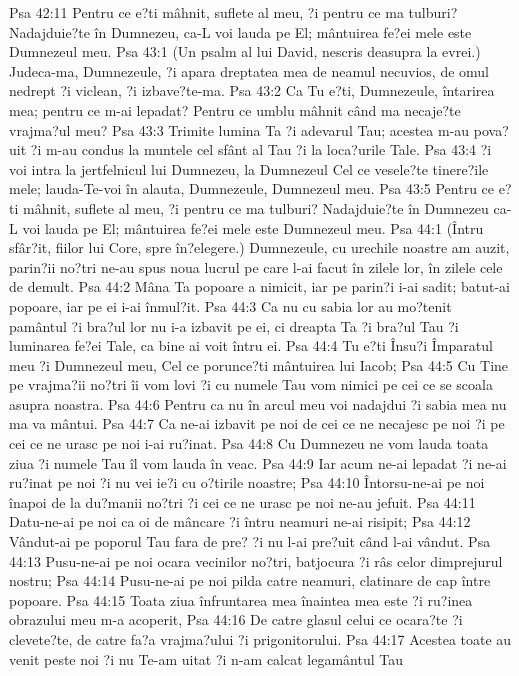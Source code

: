 Psa 42:11  Pentru ce e?ti mâhnit, suflete al meu, ?i pentru ce ma tulburi? Nadajduie?te în Dumnezeu, ca-L voi lauda pe El; mântuirea fe?ei mele este Dumnezeul meu.
Psa 43:1  (Un psalm al lui David, nescris deasupra la evrei.) Judeca-ma, Dumnezeule, ?i apara dreptatea mea de neamul necuvios, de omul nedrept ?i viclean, ?i izbave?te-ma.
Psa 43:2  Ca Tu e?ti, Dumnezeule, întarirea mea; pentru ce m-ai lepadat? Pentru ce umblu mâhnit când ma necaje?te vrajma?ul meu?
Psa 43:3  Trimite lumina Ta ?i adevarul Tau; acestea m-au pova?uit ?i m-au condus la muntele cel sfânt al Tau ?i la loca?urile Tale.
Psa 43:4  ?i voi intra la jertfelnicul lui Dumnezeu, la Dumnezeul Cel ce vesele?te tinere?ile mele; lauda-Te-voi în alauta, Dumnezeule, Dumnezeul meu.
Psa 43:5  Pentru ce e?ti mâhnit, suflete al meu, ?i pentru ce ma tulburi? Nadajduie?te în Dumnezeu ca-L voi lauda pe El; mântuirea fe?ei mele este Dumnezeul meu.
Psa 44:1  (Întru sfâr?it, fiilor lui Core, spre în?elegere.) Dumnezeule, cu urechile noastre am auzit, parin?ii no?tri ne-au spus noua lucrul pe care l-ai facut în zilele lor, în zilele cele de demult.
Psa 44:2  Mâna Ta popoare a nimicit, iar pe parin?i i-ai sadit; batut-ai popoare, iar pe ei i-ai înmul?it.
Psa 44:3  Ca nu cu sabia lor au mo?tenit pamântul ?i bra?ul lor nu i-a izbavit pe ei, ci dreapta Ta ?i bra?ul Tau ?i luminarea fe?ei Tale, ca bine ai voit întru ei.
Psa 44:4  Tu e?ti Însu?i Împaratul meu ?i Dumnezeul meu, Cel ce porunce?ti mântuirea lui Iacob;
Psa 44:5  Cu Tine pe vrajma?ii no?tri îi vom lovi ?i cu numele Tau vom nimici pe cei ce se scoala asupra noastra.
Psa 44:6  Pentru ca nu în arcul meu voi nadajdui ?i sabia mea nu ma va mântui.
Psa 44:7  Ca ne-ai izbavit pe noi de cei ce ne necajesc pe noi ?i pe cei ce ne urasc pe noi i-ai ru?inat.
Psa 44:8  Cu Dumnezeu ne vom lauda toata ziua ?i numele Tau îl vom lauda în veac.
Psa 44:9  Iar acum ne-ai lepadat ?i ne-ai ru?inat pe noi ?i nu vei ie?i cu o?tirile noastre;
Psa 44:10  Întorsu-ne-ai pe noi înapoi de la du?manii no?tri ?i cei ce ne urasc pe noi ne-au jefuit.
Psa 44:11  Datu-ne-ai pe noi ca oi de mâncare ?i întru neamuri ne-ai risipit;
Psa 44:12  Vândut-ai pe poporul Tau fara de pre? ?i nu l-ai pre?uit când l-ai vândut.
Psa 44:13  Pusu-ne-ai pe noi ocara vecinilor no?tri, batjocura ?i râs celor dimprejurul nostru;
Psa 44:14  Pusu-ne-ai pe noi pilda catre neamuri, clatinare de cap între popoare.
Psa 44:15  Toata ziua înfruntarea mea înaintea mea este ?i ru?inea obrazului meu m-a acoperit,
Psa 44:16  De catre glasul celui ce ocara?te ?i clevete?te, de catre fa?a vrajma?ului ?i prigonitorului.
Psa 44:17  Acestea toate au venit peste noi ?i nu Te-am uitat ?i n-am calcat legamântul Tau
